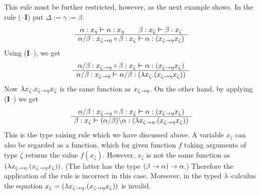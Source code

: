 This rule must be further restricted, however, as the next 
example shows. In the rule ({\mtt{\tb}}--\textbf{I}) put 
$\Delta := \gamma := \beta$.
\begin{equation}
\begin{array}{c}
\alpha : x_{\eta} \boldsymbol{\vdash} \alpha : x_{\eta} \qquad
    \beta : x_{\zeta} \boldsymbol{\vdash} \beta : x_{\zeta} \\\hline
\alpha/\beta : x_{\zeta \rightarrow \eta} \circ
    \beta : x_{\zeta} \boldsymbol{\vdash} \alpha :
    (x_{\zeta \rightarrow \eta}x_{\zeta})
\end{array}
\end{equation}
Using (\textbf{I}--{\mtt{\tf}}), we get 
\begin{equation}
\begin{array}{c}
\alpha/\beta : x_{\zeta \rightarrow \eta} \circ \beta : x_{\zeta}
    \boldsymbol{\vdash} \alpha : (x_{\zeta \rightarrow \eta}x_{\zeta})
\\\hline
\alpha/\beta : x_{\zeta \rightarrow \eta} \boldsymbol{\vdash} \alpha/\beta :
    (\lambda x_{\zeta}.(x_{\zeta \rightarrow \eta}x_{\zeta}))
\end{array}
\end{equation}
Now $\lambda x_{\zeta}.x_{\zeta \rightarrow \eta} x_{\zeta}$
is the same function as $x_{\zeta \rightarrow \eta}$. On the other hand, by applying
(\textbf{I}--{\mtt{\tb}}) we get
\begin{equation}
\begin{array}{c}
\alpha/\beta : x_{\zeta \pf \eta} \circ \beta : x_{\zeta}
    \bvdash \alpha : (x_{\zeta \pf \eta}x_{\zeta})
\\\hline
\beta : x_{\zeta}\bvdash (\alpha/\beta)\backslash \alpha :
    (\lambda x_{\zeta \pf \eta}.(%
    x_{\zeta \pf \eta}x_{\zeta}))
\end{array}
\end{equation}
This is the type raising rule which we have discussed above.
A variable $x_{\zeta}$ can also be regarded as a function, which 
for given function $f$ taking arguments of type $\zeta$ returns 
the value $f(x_{\zeta})$. However, $x_{\zeta}$ is not the same 
function as $(\lambda x_{\zeta \rightarrow \eta}.(x_{\zeta \rightarrow\eta}x_{\zeta}))$.
(The latter has the type $(\beta \rightarrow \alpha) \rightarrow \alpha$.)
Therefore the application of the rule is incorrect in this
case. Moreover, in the typed $\lambda$--calculus the equation 
$x_{\zeta} \doteq (\lambda x_{\zeta \pf \eta}.(%
    x_{\zeta \pf \eta}x_{\zeta}))$ is invalid. 

